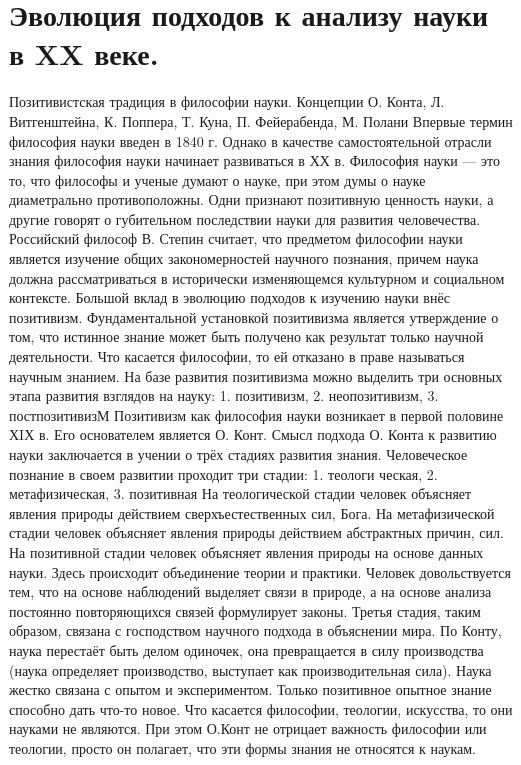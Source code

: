 \documentclass[12pt, specialist, subf, substylefile = spbu.rtx]{disser}
\begin{document}
\section{Эволюция подходов к анализу науки в XX веке.}
Позитивистская традиция в философии науки. 
Концепции О. Конта, Л. Витгенштейна, К. Поппера, 
Т. Куна, П. Фейерабенда, М. Полани 
Впервые термин философия науки введен в 1840 г. Однако в качестве самостоятельной отрасли знания философия науки начинает развиваться в ХХ в. 
Философия науки — это то, что философы и ученые думают о науке, при этом думы о науке диаметрально противоположны. Одни признают позитивную ценность науки, а другие говорят о губительном последствии науки для развития человечества. 
Российский философ В. Степин считает, что предметом философии науки является изучение общих закономерностей научного познания, причем наука должна рассматриваться в исторически изменяющемся культурном и социальном контексте. 
Большой вклад в эволюцию подходов к изучению науки внёс позитивизм. Фундаментальной установкой позитивизма является утверждение о том, что истинное знание может быть получено как результат только научной деятельности. Что касается философии, то ей отказано в праве называться научным знанием. 
На базе развития позитивизма можно выделить три основных этапа развития взглядов на науку: 
1. позитивизм, 
2. неопозитивизм, 
3. постпозитивизМ 
Позитивизм как философия науки возникает в первой половине ХIХ в. Его основателем является О. Конт. Смысл подхода О. Конта к развитию науки заключается в учении о трёх стадиях развития знания. Человеческое познание в своем развитии проходит три стадии: 
1. теологи ческая, 
2. метафизическая, 
3. позитивная 
На теологической стадии человек объясняет явления природы действием сверхъестественных сил, Бога. 
На метафизической стадии человек объясняет явления природы действием абстрактных причин, сил. 
На позитивной стадии человек объясняет явления природы на основе данных науки. Здесь происходит объединение теории и практики. Человек довольствуется тем, что на основе наблюдений выделяет связи в природе, а на основе анализа постоянно повторяющихся связей формулирует законы. Третья стадия, таким образом, связана с господством научного подхода в объяснении мира. 
По Конту, наука перестаёт быть делом одиночек, она превращается в силу производства (наука определяет производство, выступает как производительная сила). Наука жестко связана с опытом и экспериментом. Только позитивное опытное знание способно дать что-то новое. Что касается философии, теологии, искусства, то они науками не являются. При этом О.Конт не отрицает важность философии или теологии, просто он полагает, что эти формы знания не относятся к наукам. 
\end{document}
